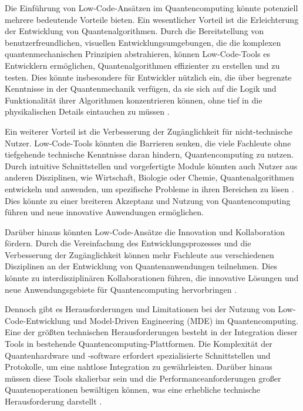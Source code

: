 Die Einführung von Low-Code-Ansätzen im Quantencomputing könnte potenziell mehrere bedeutende Vorteile bieten. 
Ein wesentlicher Vorteil ist die Erleichterung der Entwicklung von Quantenalgorithmen. Durch die 
Bereitstellung von benutzerfreundlichen, visuellen Entwicklungsumgebungen, die die komplexen 
quantenmechanischen Prinzipien abstrahieren, können Low-Code-Tools es Entwicklern ermöglichen, 
Quantenalgorithmen effizienter zu erstellen und zu testen. Dies könnte insbesondere für Entwickler nützlich 
ein, die über begrenzte Kenntnisse in der Quantenmechanik verfügen, da sie sich auf die Logik und 
Funktionalität ihrer Algorithmen konzentrieren können, ohne tief in die physikalischen Details 
eintauchen zu müssen \cite{Cabot_2020}.

Ein weiterer Vorteil ist die Verbesserung der Zugänglichkeit für nicht-technische Nutzer. Low-Code-Tools 
könnten die Barrieren senken, die viele Fachleute ohne tiefgehende technische Kenntnisse daran hindern, 
Quantencomputing zu nutzen. Durch intuitive Schnittstellen und vorgefertigte Module könnten auch Nutzer 
aus anderen Disziplinen, wie Wirtschaft, Biologie oder Chemie, Quantenalgorithmen entwickeln und 
anwenden, um spezifische Probleme in ihren Bereichen zu lösen \cite{di2022low}. Dies könnte zu 
einer breiteren Akzeptanz und Nutzung von Quantencomputing führen und neue innovative Anwendungen ermöglichen.

Darüber hinaus könnten Low-Code-Ansätze die Innovation und Kollaboration fördern. Durch die 
Vereinfachung des Entwicklungsprozesses und die Verbesserung der Zugänglichkeit können mehr Fachleute 
aus verschiedenen Disziplinen an der Entwicklung von Quantenanwendungen teilnehmen. Dies könnte zu 
interdisziplinären Kollaborationen führen, die innovative Lösungen und neue Anwendungsgebiete für 
Quantencomputing hervorbringen \cite{di2022low}.

Dennoch gibt es Herausforderungen und Limitationen bei der Nutzung von Low-Code-Entwicklung und 
Model-Driven Engineering (MDE) im Quantencomputing. Eine der größten technischen Herausforderungen 
besteht in der Integration dieser Tools in bestehende Quantencomputing-Plattformen. Die Komplexität 
der Quantenhardware und -software erfordert spezialisierte Schnittstellen und Protokolle, um eine 
nahtlose Integration zu gewährleisten. Darüber hinaus müssen diese Tools skalierbar sein und die 
Performanceanforderungen großer Quantenoperationen bewältigen können, was eine erhebliche technische 
Herausforderung darstellt \cite{monroe2013scaling}.

